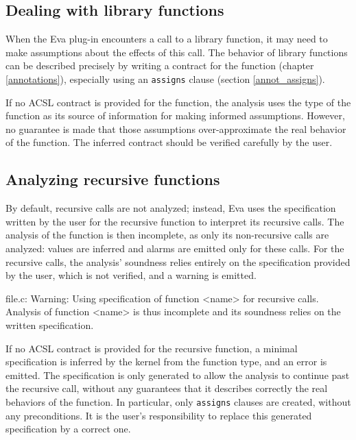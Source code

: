 \documentclass[web]{frama-c-book}
\newcommand{\Eva}{\textsf{Eva}}
\begin{document}
\subsection{Dealing with library functions}

When the \Eva{} plug-in encounters a call to a library
function, it may need to make assumptions about the effects of this call.
The behavior of library functions can be described precisely
by writing a contract for the function (chapter \ref{annotations}),
especially using an \lstinline|assigns| clause (section \ref{annot_assigns}).

If no ACSL contract is provided for the function, the analysis uses the
type of the function as its source of information for making
informed assumptions. However, no guarantee is made that those assumptions
over-approximate the real behavior of the function. The inferred
contract should be verified carefully by the user.

\subsection{Analyzing recursive functions}
\label{recursion}

By default, recursive calls are not analyzed; instead, \Eva{} uses the
specification written by the user for the recursive function to interpret
its recursive calls. The analysis of the function is then incomplete,
as only its non-recursive calls are analyzed: values are inferred and
alarms are emitted only for these calls.
For the recursive calls, the analysis' soundness relies entirely on the
specification provided by the user, which is not verified, and a warning
is emitted.

\begin{logs}
[eva] file.c: Warning:
  Using specification of function <name> for recursive calls.
  Analysis of function <name> is thus incomplete and its soundness
  relies on the written specification.
\end{logs}

If no ACSL contract is provided for the recursive function,
a minimal specification is inferred by the \FramaC kernel
from the function type, and an error is emitted.
The specification is only generated to allow the analysis to continue
past the recursive call, without any guarantees that it describes correctly
the real behaviors of the function.
In particular, only \lstinline|assigns| clauses are created, without any
preconditions.
It is the user's responsibility to replace this generated specification by
a correct one.
\end{document}
